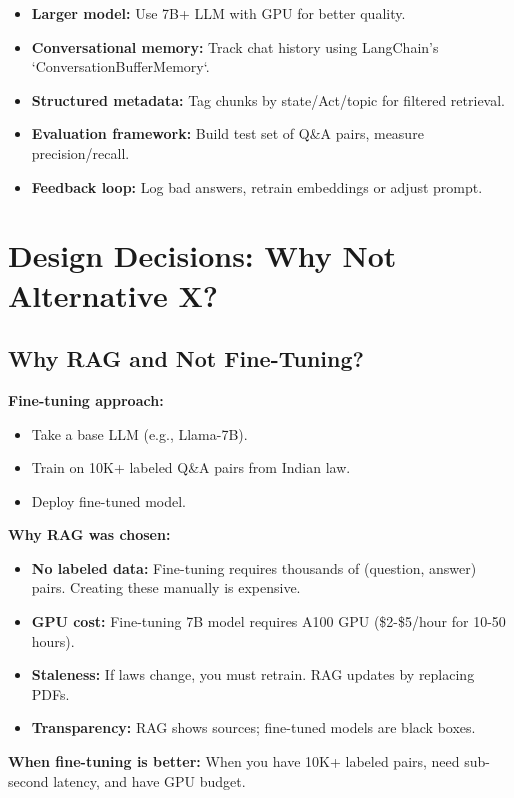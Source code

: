 \documentclass[11pt,a4paper]{article}
\begin{document}
\begin{itemize}
\item \textbf{Larger model:} Use 7B+ LLM with GPU for better quality.
\item \textbf{Conversational memory:} Track chat history using LangChain's `ConversationBufferMemory`.
\item \textbf{Structured metadata:} Tag chunks by state/Act/topic for filtered retrieval.
\item \textbf{Evaluation framework:} Build test set of Q\&A pairs, measure precision/recall.
\item \textbf{Feedback loop:} Log bad answers, retrain embeddings or adjust prompt.
\end{itemize}

\section{Design Decisions: Why Not Alternative X?}

\subsection{Why RAG and Not Fine-Tuning?}

\textbf{Fine-tuning approach:}
\begin{itemize}
\item Take a base LLM (e.g., Llama-7B).
\item Train on 10K+ labeled Q\&A pairs from Indian law.
\item Deploy fine-tuned model.
\end{itemize}

\textbf{Why RAG was chosen:}
\begin{itemize}
\item \textbf{No labeled data:} Fine-tuning requires thousands of (question, answer) pairs. Creating these manually is expensive.
\item \textbf{GPU cost:} Fine-tuning 7B model requires A100 GPU (\$2-\$5/hour for 10-50 hours).
\item \textbf{Staleness:} If laws change, you must retrain. RAG updates by replacing PDFs.
\item \textbf{Transparency:} RAG shows sources; fine-tuned models are black boxes.
\end{itemize}

\textbf{When fine-tuning is better:} When you have 10K+ labeled pairs, need sub-second latency, and have GPU budget.
\end{document}

